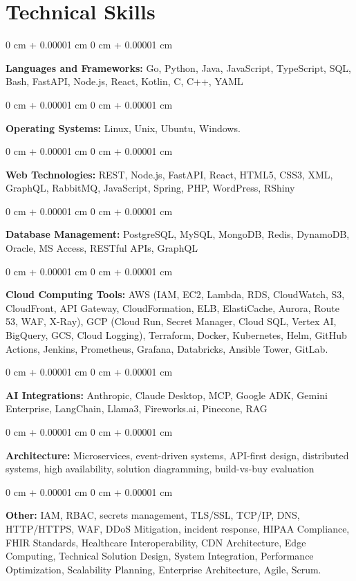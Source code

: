 \documentclass[10pt, letterpaper]{article}
\newenvironment{onecolentry}{
    \begin{adjustwidth}{
        0 cm + 0.00001 cm
    }{
        0 cm + 0.00001 cm
    }
}{
    \end{adjustwidth}
} %
\begin{document}
    \section{Technical Skills}
    \vspace{2 pt }
    \begin{onecolentry}
    \textbf{Languages and Frameworks:} Go, Python, Java, JavaScript, TypeScript, SQL, Bash, FastAPI, Node.js, React, Kotlin, C, C++, YAML
    \end{onecolentry}
    \begin{onecolentry}
        \textbf{Operating Systems:} Linux, Unix, Ubuntu, Windows.
    \end{onecolentry}
    \begin{onecolentry}
         \textbf{Web Technologies:} REST, Node.js, FastAPI, React, HTML5, CSS3, XML, GraphQL, RabbitMQ, JavaScript, Spring, PHP, WordPress, RShiny \end{onecolentry}
    \begin{onecolentry}
        \textbf{Database Management:} PostgreSQL, MySQL, MongoDB, Redis, DynamoDB, Oracle, MS Access, RESTful APIs, GraphQL \end{onecolentry}
    \begin{onecolentry}
        \textbf{Cloud Computing Tools:}
AWS (IAM, EC2, Lambda, RDS, CloudWatch, S3, CloudFront, API Gateway, CloudFormation, ELB, ElastiCache, Aurora, Route 53, WAF, X-Ray), GCP (Cloud Run, Secret Manager, Cloud SQL, Vertex AI, BigQuery, GCS, Cloud Logging), Terraform, Docker, Kubernetes, Helm, GitHub Actions, Jenkins, Prometheus, Grafana, Databricks, Ansible Tower, GitLab.
    \end{onecolentry}
    \begin{onecolentry}
         \textbf{AI Integrations:} Anthropic, Claude Desktop, MCP, Google ADK, Gemini Enterprise, LangChain, Llama3, Fireworks.ai, Pinecone, RAG \end{onecolentry}
    \begin{onecolentry}
        \textbf{Architecture:} Microservices, event-driven systems, API-first design, distributed systems, high availability, solution diagramming, build-vs-buy evaluation \end{onecolentry}
        \begin{onecolentry}
     \textbf{Other:} IAM, RBAC, secrets management, TLS/SSL, TCP/IP, DNS, HTTP/HTTPS, WAF, DDoS Mitigation, incident response, HIPAA Compliance, FHIR Standards, Healthcare Interoperability, CDN Architecture, Edge Computing, Technical Solution Design, System Integration, Performance Optimization, Scalability Planning, Enterprise Architecture, Agile, Scrum.
    \end{onecolentry}
\end{document}

